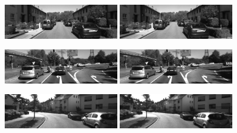 \documentclass[a4paper,10pt]{article}
\begin{document}
\begin{figure}[h!]
  \begin{center}     
    \includegraphics[width=0.45\textwidth]{stereo_images/images0/kitti_3_left}
    \includegraphics[width=0.45\textwidth]{stereo_images/images1/kitti_3_right}
\end{center}
\end{figure}  

\begin{figure}[h!]
  \begin{center}         
    \includegraphics[width=0.45\textwidth]{stereo_images/images0/kitti_4_left}
    \includegraphics[width=0.45\textwidth]{stereo_images/images1/kitti_4_right}
\end{center}
\end{figure}  
    
 \begin{figure}[h!]
  \begin{center}  
    \includegraphics[width=0.45\textwidth]{stereo_images/images0/kitti_5_left}
    \includegraphics[width=0.45\textwidth]{stereo_images/images1/kitti_5_right}
\end{center}
\end{figure}  
\end{document}
